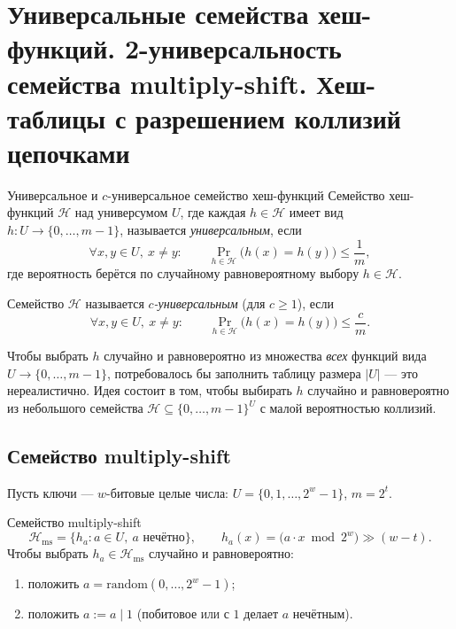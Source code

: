 
\section{Универсальные семейства хеш-функций. 2-универсальность семейства multiply-shift. Хеш-таблицы с разрешением коллизий цепочками}

\begin{Definition}{Универсальное и $c$-универсальное семейство хеш-функций}{}
	Семейство хеш-функций $\mathcal{H}$ над универсумом $U$, где каждая $h \in \mathcal{H}$ имеет вид $h\colon U \to \{0,\ldots,m-1\}$, называется \emph{универсальным}, если
	\[
	\forall x,y \in U,\ x \neq y\colon\qquad
	\Pr_{h \in \mathcal{H}}\bigl(h(x) = h(y)\bigr) \leq \frac{1}{m},
	\]
	где вероятность берётся по случайному равновероятному выбору $h \in \mathcal{H}$.
	
	Семейство $\mathcal{H}$ называется \emph{$c$-универсальным} (для $c \geq 1$), если
	\[
	\forall x,y \in U,\ x \neq y\colon\qquad
	\Pr_{h \in \mathcal{H}}\bigl(h(x) = h(y)\bigr) \leq \frac{c}{m}.
	\]
\end{Definition}

\begin{Remark}{}{}
	Чтобы выбрать $h$ случайно и равновероятно из множества \emph{всех} функций вида $U \to \{0,\ldots,m-1\}$, потребовалось бы заполнить таблицу размера $|U|$ --- это нереалистично. Идея состоит в том, чтобы выбирать $h$ случайно и равновероятно из небольшого семейства $\mathcal{H} \subseteq \{0,\ldots,m-1\}^{U}$ с малой вероятностью коллизий.
\end{Remark}

\subsection{Семейство multiply-shift}

Пусть ключи --- $w$-битовые целые числа: $U = \{0,1,\ldots,2^w-1\}$, $m = 2^t$.

\begin{Definition}{Семейство multiply-shift}{}
	\[
	\mathcal{H}_{\mathrm{ms}} = \{h_a : a \in U,\ a \text{ нечётно}\},
	\qquad
	h_a(x) = \bigl(a \cdot x \bmod 2^w\bigr) \gg (w-t).
	\]
	Чтобы выбрать $h_a \in \mathcal{H}_{\mathrm{ms}}$ случайно и равновероятно:
	\begin{enumerate}
		\item положить $a = \mathrm{random}(0,\ldots,2^w-1)$;
		\item положить $a := a \mathbin{|} 1$ (побитовое \textsc{или} с $1$ делает $a$ нечётным).
	\end{enumerate}
\end{Definition}

